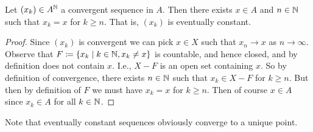 \begin{lemma}
  Let $(x_k) \in A^{\mathbb{N}}$ a convergent sequence in $A$. Then there exists
  $x \in A$ and $n \in \mathbb{N}$ such that $x_k = x$ for $k \ge n$. That is,
  $(x_k)$ is \textup{eventually constant}.
\end{lemma}

\begin{proof}
  Since $(x_k)$ is convergent we can pick $x \in X$ such that $x_n \to
  x$ as $n \to \infty$. Observe that $F \coloneqq \{x_k \mid k \in \mathbb{N}, x_k
  \ne x\}$ is countable, and hence closed, and by definition does not
  contain $x$. I.e., $X - F$ is an open set containing $x$. So by
  definition of convergence, there exists $n \in \mathbb{N}$ such that $x_k
  \in X - F$ for $k \ge n$. But then by definition of $F$ we must have
  $x_k = x$ for $k \ge n$. Then of course $x \in A$ since $x_k \in A$
  for all $k \in \mathbb{N}$.
\end{proof}

Note that eventually constant sequences obviously converge to a unique
point.





